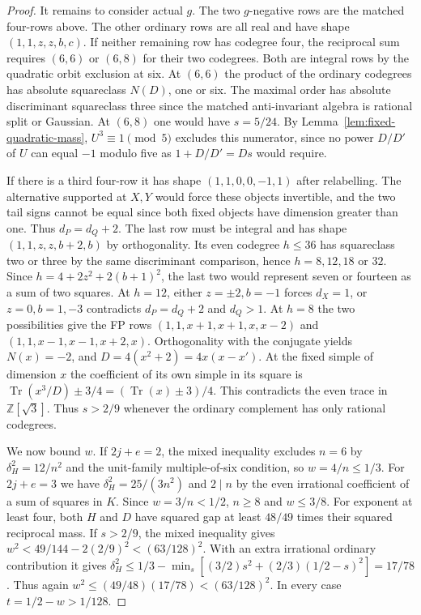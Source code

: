 \documentclass[11pt,reqno]{amsart}
\theoremstyle{remark}\newtheorem{remark}[theorem]{Remark}
\numberwithin{equation}{section}
\begin{document}
\begin{proof}
It remains to consider actual $g$. The two $g$-negative rows are
the matched four-rows above. The other ordinary rows are all real
and have shape $(1,1,z,z,b,c)$. If neither remaining row has
codegree four, the reciprocal sum requires $(6,6)$ or $(6,8)$
for their two codegrees. Both are integral rows by the quadratic
orbit exclusion at six. At $(6,6)$ the product of the ordinary
codegrees has absolute squareclass $N(D)$, one or six. The
maximal order has absolute discriminant squareclass three since
the matched anti-invariant algebra is rational split or Gaussian.
At $(6,8)$ one would have $s=5/24$. By Lemma~\ref{lem:fixed-quadratic-mass}, $U^3\equiv1\pmod5$ excludes this numerator, since
no power $D/D'$ of $U$ can equal $-1$ modulo five as
$1+D/D'=Ds$ would require.

If there is a third four-row it has shape
$(1,1,0,0,-1,1)$ after relabelling. The alternative supported at
$X,Y$ would force these objects invertible, and the two tail
signs cannot be equal since both fixed objects have dimension
greater than one. Thus $d_P=d_Q+2$. The last row must be integral
and has shape $(1,1,z,z,b+2,b)$ by orthogonality. Its even
codegree $h\le36$ has squareclass two or three by the same
discriminant comparison, hence $h=8,12,18$ or $32$.
Since $h=4+2z^2+2(b+1)^2$, the last two would represent seven
or fourteen as a sum of two squares. At $h=12$, either
$z=\pm2,b=-1$ forces $d_X=1$, or $z=0,b=1,-3$ contradicts
$d_P=d_Q+2$ and $d_Q>1$. At $h=8$ the two possibilities give
the FP rows $(1,1,x+1,x+1,x,x-2)$ and
$(1,1,x-1,x-1,x+2,x)$. Orthogonality with the conjugate yields
$N(x)=-2$, and $D=4(x^2+2)=4x(x-x')$. At the fixed simple of
dimension $x$ the coefficient of its own simple in its square is
$\operatorname{Tr}(x^3/D)\pm3/4=(\operatorname{Tr}(x)\pm3)/4$.
This contradicts the even trace in $\mathbb Z[\sqrt3]$. Thus
$s>2/9$ whenever the ordinary complement has only rational codegrees.

We now bound $w$. If $2j+e=2$, the mixed inequality excludes
$n=6$ by $\delta_H^2=12/n^2$ and the unit-family multiple-of-six
condition, so $w=4/n\le1/3$. For $2j+e=3$ we have
$\delta_H^2=25/(3n^2)$ and $2\mid n$ by the even irrational
coefficient of a sum of squares in $K$. Since $w=3/n<1/2$,
$n\ge8$ and $w\le3/8$. For exponent at least four, both $H$
and $D$ have squared gap at least $48/49$ times their squared
reciprocal mass. If $s>2/9$, the mixed inequality gives
$w^2<49/144-2(2/9)^2<(63/128)^2$. With an extra irrational
ordinary contribution it gives
$\delta_H^2\le1/3-\min_s[(3/2)s^2+(2/3)(1/2-s)^2]=17/78$.
Thus again $w^2\le(49/48)(17/78)<(63/128)^2$.
In every case $t=1/2-w>1/128$.
\end{proof}
\end{document}
